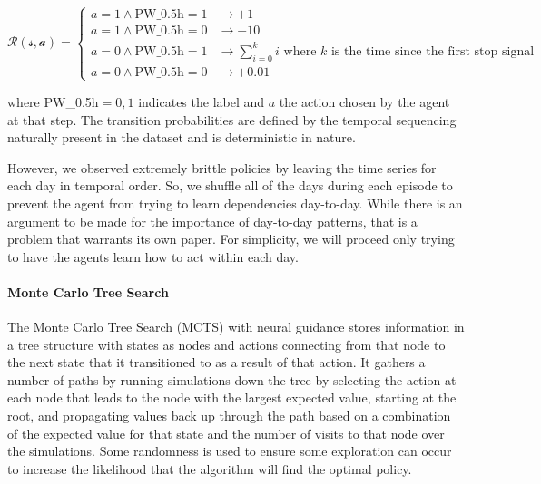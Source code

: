 \documentclass[12pt]{article}
\begin{document}
\[ \mathcal{R(s,a)} =
    \begin{cases}
        a=1 \land \text{PW\_0.5h}=1       &\to +1 \\
        a=1 \land \text{PW\_0.5h}=0       &\to -10 \\
        a=0 \land \text{PW\_0.5h}=1       &\to \sum_{i=0}^k i \text{ where $k$ is the time since the first stop signal} \\
        a=0 \land \text{PW\_0.5h}=0       &\to +0.01
    \end{cases}
\]

where PW\_0.5h$={0,1}$ indicates the label and $a$ the action chosen by the agent at that step. The transition probabilities
are defined by the temporal sequencing naturally present in the dataset and is deterministic in nature.

However, we observed extremely brittle policies by leaving the time series for each day in temporal order. So, we
shuffle all of the days during each episode to prevent the agent from trying to learn dependencies day-to-day. While
there is an argument to be made for the importance of day-to-day patterns, that is a problem that warrants its own
paper. For simplicity, we will proceed only trying to have the agents learn how to act within each day.

\paragraph{Monte Carlo Tree Search}
The Monte Carlo Tree Search (MCTS) with neural guidance stores information in a tree structure with states as nodes
and actions connecting from that node to the next state that it transitioned to as a result of that action. It
gathers a number of paths by running simulations down the tree by selecting the action at each node that leads to
the node with the largest expected value, starting at the root, and propagating values back up
through the path based on a combination of the expected value for that state and the number of visits to that node
over the simulations. Some randomness is used to ensure some exploration can occur to increase the likelihood that
the algorithm will find the optimal policy.
\end{document}

